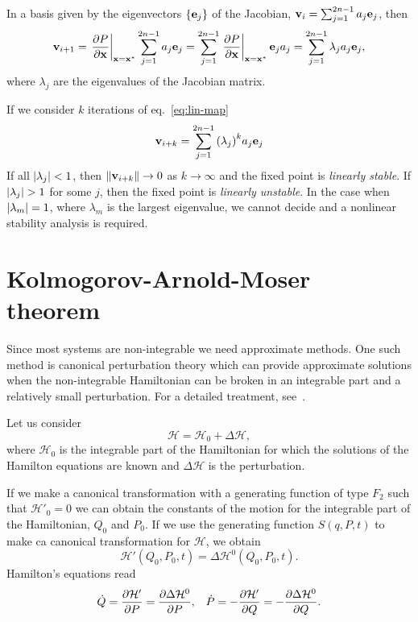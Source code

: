 \documentclass[../thesis.tex]{subfiles}
\theoremstyle{plain}
\begin{document}
In a basis given by the eigenvectors \( \{\vb{e}_j\} \) of the Jacobian,
\(\vb{v}_{i} = \sum_{j=1}^{2n-1} a_j \vb{e}_j\), then
\[
  \vb{v}_{i+1} = \eval{\pdv{P}{\vb{x}}}_{\vb{x}=\vb{x}^*} \sum_{j=1}^{2n-1} a_j \vb{e}_j
               = \sum_{j=1}^{2n-1} \eval{\pdv{P}{\vb{x}}}_{\vb{x}=\vb{x}^*} \vb{e}_j a_j
               = \sum_{j=1}^{2n-1} \lambda_j a_j \vb{e}_j,
\]
where \(\lambda_j\) are the eigenvalues of the Jacobian matrix.

If we consider \(k\) iterations of eq.~\eqref{eq:lin-map}
\[
  \vb{v}_{i+k} = \sum_{j=1}^{2n-1} {(\lambda_j)}^k a_j \vb{e}_j
\]
If all \(\abs{\lambda_j} < 1\), then \(\norm{\vb{v}_{i+k}} \to 0\) as \(k\to\infty \)
and the fixed point is \emph{linearly stable}. If \(\abs{\lambda_j} > 1\) for
some \(j\), then the fixed point is \emph{linearly unstable}. In the case when
\(\abs{\lambda_m}=1\), where \(\lambda_m\) is the largest eigenvalue, we cannot
decide and a nonlinear stability analysis is required.


\section{Kolmogorov-Arnold-Moser theorem}

Since most systems are non-integrable we need approximate methods. One such
method is canonical perturbation theory which can provide approximate solutions
when the non-integrable Hamiltonian can be broken in an integrable part and
a relatively small perturbation. For a detailed treatment, see~\cite{Goldstein2002}.

Let us consider
\[
  \mathcal{H} = \mathcal{H}_0 + \Delta \mathcal{H},
\]
where \(\mathcal{H}_0\) is the integrable part of the Hamiltonian for
which the solutions of the Hamilton equations are known and
\(\Delta \mathcal{H}\) is the perturbation.

If we make a canonical transformation with a generating function of type
\(F_2\) such that \(\mathcal{H'}_0 = 0\) we can obtain the constants of the
motion for the integrable part of the Hamiltonian, \(Q_0\) and \(P_0\).
If we use the generating function \(S(q,P,t)\) to make ca canonical transformation
for \(\mathcal{H}\), we obtain
\[
  \mathcal{H'}(Q_0,P_0,t) = \Delta \mathcal{H}^0(Q_0,P_0,t).
\]
Hamilton's equations read
\begin{align*}
  \dot{Q} = \pdv{\mathcal{H'}}{P} = \pdv{\Delta \mathcal{H}^0}{P}, &&
  \dot{P} = -\pdv{\mathcal{H'}}{Q} = -\pdv{\Delta \mathcal{H}^0}{Q}.
\end{align*}
\end{document}
